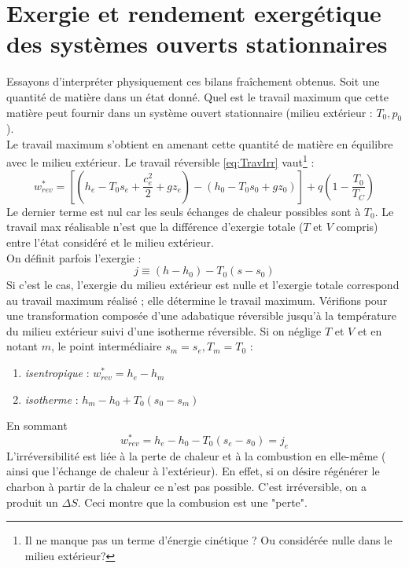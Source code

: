 		
	\newpage
	\section{Exergie et rendement exergétique des systèmes ouverts stationnaires}
	Essayons d’interpréter physiquement ces bilans fraîchement obtenus. Soit une 
	quantité de matière dans un état donné. Quel est le travail maximum que cette 
	matière peut fournir dans un système ouvert stationnaire (milieu extérieur : 
	$T_0,p_0$).\\
	Le travail maximum s'obtient en amenant cette quantité de matière en équilibre 
	avec le milieu extérieur. Le travail réversible \autoref{eq:TravIrr} vaut\footnote{
	Il ne manque pas un terme d'énergie cinétique ? Ou considérée nulle dans le milieu extérieur?} :
	\begin{equation}
	w_{rev}^* = \left[\left(h_e-T_0s_e+\dfrac{c_e^2}{2}+gz_e\right) - \left(h_0-T_0s_0
	+gz_0\right)\right] + q\left(1-\dfrac{T_0}{T_C}\right)
	\end{equation}
	Le dernier terme est nul car les seuls échanges de chaleur possibles sont à $T_0$. 
	Le travail max réalisable n'est que la différence d'exergie totale ($T$ et $V$ compris) 
	entre l'état considéré et le milieu extérieur.\\
	On définit parfois l'exergie :
	\begin{equation}
	j \equiv (h-h_0) - T_0(s-s_0)
	\end{equation}
	Si c'est le cas, l'exergie du milieu extérieur est nulle et l'exergie totale 
	correspond au travail maximum réalisé ; elle détermine le travail maximum. Vérifions 
	pour une transformation composée d'une adabatique réversible jusqu'à la température 
	du milieu extérieur suivi d'une isotherme réversible. Si on néglige $T$ et $V$ et 
	en notant $m$, le point intermédiaire $s_m=s_e, T_m=T_0$ :
	\begin{enumerate}
	\item \textit{isentropique} : $w_{rev}^* = h_e-h_m$
 	\item \textit{isotherme} : $h_m-h_0 + T_0(s_0-s_m)$
	\end{enumerate}
	En sommant
	\begin{equation}
	w_{rev}^* = h_e-h_0 - T_0(s_e-s_0) = j_e
	\end{equation}
	L'irréversibilité est liée à la perte de chaleur et à la combustion en elle-même (%
	ainsi que l'échange de chaleur à l'extérieur). En effet, si on désire régénérer 
	le charbon à partir de la chaleur ce n'est pas possible. C'est irréversible, on a 
	produit un $\Delta S$. Ceci montre que la combusion est une "perte".\\
	
